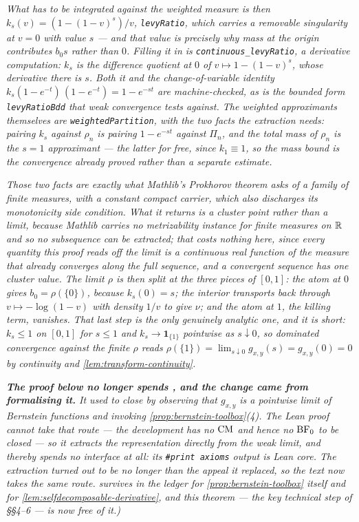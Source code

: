 \begin{theorem}
\emph{What has to be integrated against the weighted measure is then
$k_s(v) = (1 - (1-v)^s)/v$,
\texttt{levyRatio}, which carries a removable singularity at $v = 0$ with value $s$ --- and that
value is precisely why mass at the origin contributes $b_0 s$ rather than $0$. Filling it in is
\texttt{continuous\_levyRatio}, a derivative computation: $k_s$ is the difference quotient at
$0$ of $v \mapsto 1 - (1-v)^s$, whose derivative there is $s$. Both it and the change-of-variable
identity $k_s(1 - e^{-t})\,(1 - e^{-t}) = 1 - e^{-st}$ are machine-checked, as is the bounded
form \texttt{levyRatioBdd} that weak convergence tests against. The weighted approximants
themselves are \texttt{weightedPartition}, with the two facts the extraction needs: pairing
$k_s$ against $\rho_n$ is pairing $1 - e^{-st}$ against $\Pi_n$, and the total mass of $\rho_n$
is the $s = 1$ approximant --- the latter for free, since $k_1 \equiv 1$, so the mass bound is
the convergence already proved rather than a separate estimate.}

\emph{Those two facts are exactly what Mathlib's Prokhorov theorem asks of a family of finite
measures, with a \emph{constant} compact carrier, which also discharges its monotonicity side
condition. What it returns is a cluster point rather than a limit, because Mathlib carries no
metrizability instance for finite measures on $\mathbb{R}$ and so no subsequence can be extracted; that
costs nothing here, since every quantity this proof reads off the limit is a continuous real
function of the measure that already converges along the full sequence, and a convergent
sequence has one cluster value. The limit $\rho$ is then split at the three pieces of $[0,1]$:
the atom at $0$ gives $b_0 = \rho(\{0\})$, because $k_s(0) = s$; the interior transports back
through $v \mapsto -\log(1-v)$ with density $1/v$ to give $\nu$; and the atom at $1$, the
killing term, vanishes. That last step is the only genuinely analytic one, and it is short:
$k_s \le 1$ on $[0,1]$ for $s \le 1$ and $k_s \to \mathbf{1}_{\{1\}}$ pointwise as $s \downarrow
0$, so dominated convergence against the \emph{finite} $\rho$ reads
$\rho(\{1\}) = \lim_{s \downarrow 0} g_{x,y}(s) = g_{x,y}(0) = 0$ by continuity and
\ref{lem:transform-continuity}.}

\emph{\textbf{The proof below no longer spends , and the change came from formalising
it.} It used to close by observing that $g_{x,y}$ is a pointwise limit of Bernstein functions and
invoking \ref{prop:bernstein-toolbox}(4). The Lean proof cannot take that route --- the
development has no $\mathrm{CM}$ and hence no $\mathrm{BF}_0$ to be closed --- so it extracts the representation
directly from the weak limit, and thereby spends no interface at all: its
\texttt{\#print axioms} output is Lean core. The extraction turned out to be no longer than the
appeal it replaced, so the text now takes the same route.  survives in the ledger for
\ref{prop:bernstein-toolbox} itself and for \ref{lem:selfdecomposable-derivative}, and this
theorem --- the key technical step of \S\S4--6 --- is now free of it.)}
\end{theorem}

